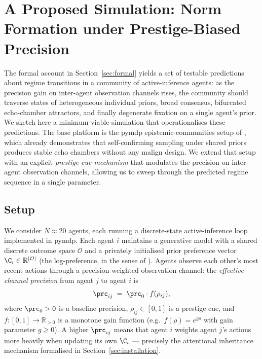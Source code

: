 \section{A Proposed Simulation: Norm Formation under Prestige-Biased Precision}%
\label{sec:simulation}

The formal account in Section~\ref{sec:formal} yields a set of testable predictions about
regime transitions in a community of active-inference agents: as the precision
gain on inter-agent observation channels rises, the community should traverse
states of heterogeneous individual priors, broad consensus, bifurcated
echo-chamber attractors, and finally degenerate fixation on a single agent's
prior. We sketch here a minimum viable simulation that operationalises these
predictions. The base platform is the pymdp epistemic-communities setup of
\citet{albarracin2022EpistemicCommunities}, which already demonstrates that
self-confirming sampling under shared priors produces stable echo chambers
without any malign design. We extend that setup with an explicit
\emph{prestige-cue mechanism} that modulates the precision on inter-agent
observation channels, allowing us to sweep through the predicted regime
sequence in a single parameter.

\subsection*{Setup}

We consider $N \approx 20$ agents, each running a discrete-state active-inference
loop implemented in pymdp. Each agent $i$ maintains a generative model with a
shared discrete outcome space $\mathcal{O}$ and a privately initialised prior
preference vector $\C_i \in \mathbb{R}^{|\mathcal{O}|}$ (the log-preference, in
the sense of \citealt{torresan2025ShapeC}).  Agents observe each other's most
recent actions through a precision-weighted observation channel: the
\emph{effective channel precision} from agent $j$ to agent $i$ is
\begin{equation}
  \prc_{ij} \;=\; \prc_0 \cdot f(\rho_{ij}),
  \label{eq:prestige-precision}
\end{equation}
where $\prc_0 > 0$ is a baseline precision, $\rho_{ij} \in [0,1]$ is a
prestige cue, and $f : [0,1] \to \mathbb{R}_{>0}$ is a monotone gain function
(e.g.\ $f(\rho) = e^{g\rho}$ with gain parameter $g \geq 0$). A higher
$\prc_{ij}$ means that agent $i$ weights agent $j$'s actions more heavily when
updating its own $\C_i$ --- precisely the attentional inheritance mechanism
formalised in Section~\ref{sec:installation}.

